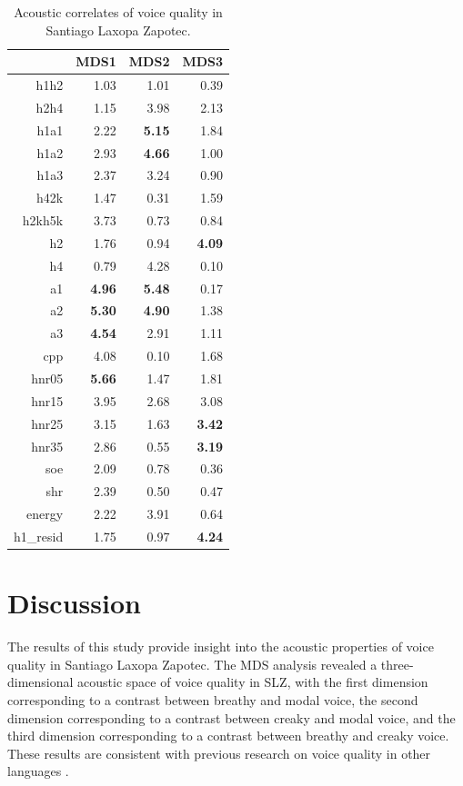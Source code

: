 \begin{table}[ht]
    \centering
    \caption{Acoustic correlates of voice quality in Santiago Laxopa Zapotec.} 
    \label{tab:acoustic_correlates}
    \begin{tabular}{rrrr}
      \hline
     & MDS1 & MDS2 & MDS3 \\ 
      \hline
    h1h2 & 1.03 & 1.01 & 0.39 \\ 
    h2h4 & 1.15 & 3.98 & 2.13 \\ 
    h1a1 & 2.22 & \textbf{5.15} & 1.84 \\ 
    h1a2 & 2.93 & \textbf{4.66} & 1.00 \\ 
    h1a3 & 2.37 & 3.24 & 0.90 \\ 
    h42k & 1.47 & 0.31 & 1.59 \\ 
    h2kh5k & 3.73 & 0.73 & 0.84 \\ 
    h2 & 1.76 & 0.94 & \textbf{4.09} \\ 
    h4 & 0.79 & 4.28 & 0.10 \\ 
    a1 & \textbf{4.96} & \textbf{5.48} & 0.17 \\ 
    a2 & \textbf{5.30} & \textbf{4.90} & 1.38 \\ 
    a3 & \textbf{4.54} & 2.91 & 1.11 \\ 
    cpp & 4.08 & 0.10 & 1.68 \\ 
    hnr05 & \textbf{5.66} & 1.47 & 1.81 \\ 
    hnr15 & 3.95 & 2.68 & 3.08 \\ 
    hnr25 & 3.15 & 1.63 & \textbf{3.42} \\ 
    hnr35 & 2.86 & 0.55 & \textbf{3.19} \\ 
    soe & 2.09 & 0.78 & 0.36 \\ 
    shr & 2.39 & 0.50 & 0.47 \\ 
    energy & 2.22 & 3.91 & 0.64 \\ 
    h1\_resid & 1.75 & 0.97 & \textbf{4.24} \\ 
    \hline
    \end{tabular}
\end{table}

\section{Discussion} \label{sec:acousticlandscape:discussion}
The results of this study provide insight into the acoustic properties of voice quality in Santiago Laxopa Zapotec. The MDS analysis revealed a three-dimensional acoustic space of voice quality in SLZ, with the first dimension corresponding to a contrast between breathy and modal voice, the second dimension corresponding to a contrast between creaky and modal voice, and the third dimension corresponding to a contrast between breathy and creaky voice. These results are consistent with previous research on voice quality in other languages \citep{keatingCrosslanguageAcousticSpace2023}.